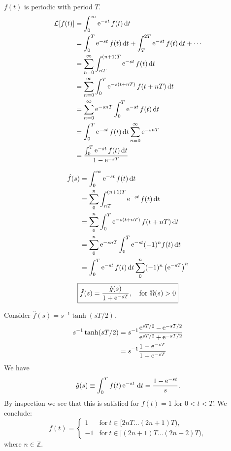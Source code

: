 {%
\begin{Solution}
  \label{solution L(f) f periodic}
  $f(t)$ is periodic with period $T$.
  \begin{align*}
    \mathcal{L}[f(t)]
    &= \int_0^\infty \mathop{\mathrm{e}}\nolimits^{-s t} f(t)\,\mathrm{d} t \\
    &= \int_0^T \mathop{\mathrm{e}}\nolimits^{-s t} f(t)\,\mathrm{d} t + \int_T^{2T} \mathop{\mathrm{e}}\nolimits^{-s t} f(t)\,\mathrm{d} t + \cdots \\
    &= \sum_{n=0}^\infty \int_{n T}^{(n+1)T} \mathop{\mathrm{e}}\nolimits^{-s t} f(t)\,\mathrm{d} t \\
    &= \sum_{n=0}^\infty \int_0^T \mathop{\mathrm{e}}\nolimits^{-s (t+n T)} f(t+n T)\,\mathrm{d} t \\
    &= \sum_{n=0}^\infty \mathop{\mathrm{e}}\nolimits^{-s n T} \int_0^T \mathop{\mathrm{e}}\nolimits^{-s t} f(t)\,\mathrm{d} t \\
    &= \int_0^T \mathop{\mathrm{e}}\nolimits^{-s t} f(t)\,\mathrm{d} t \sum_{n=0}^\infty \mathop{\mathrm{e}}\nolimits^{-s n T} \\
    &= \frac{\int_0^T \mathop{\mathrm{e}}\nolimits^{-s t} f(t)\,\mathrm{d} t}{1-\mathop{\mathrm{e}}\nolimits^{-s T}}
  \end{align*}
\end{Solution}







\begin{Solution}
  \label{solution L(f) f odd periodic}
  \begin{align*}
    \hat{f}(s)    
    &= \int_0^\infty \mathop{\mathrm{e}}\nolimits^{-s t} f(t) \,\mathrm{d} t \\
    &= \sum_0^n  \int_{n T}^{(n+1) T} \mathop{\mathrm{e}}\nolimits^{-s t} f(t) \,\mathrm{d} t \\
    &= \sum_0^n \int_0^T \mathop{\mathrm{e}}\nolimits^{-s (t + n T)} f(t + n T) \,\mathrm{d} t \\
    &= \sum_0^n \mathop{\mathrm{e}}\nolimits^{-s n T} \int_0^T \mathop{\mathrm{e}}\nolimits^{-s t} (-1)^n f(t) \,\mathrm{d} t \\
    &= \int_0^T \mathop{\mathrm{e}}\nolimits^{-s t} f(t) \,\mathrm{d} t \sum_0^n (-1)^n \left( \mathop{\mathrm{e}}\nolimits^{-s T} \right)^n 
  \end{align*}
  \[
  \boxed{
    \hat{f}(s) = \frac{ \hat{g}(s) }{ 1 + \mathop{\mathrm{e}}\nolimits^{-s T} }, \quad \mathrm{for}\ \Re(s) > 0
    }
  \]

  Consider $\hat{f}(s) = s^{-1} \tanh(s T/2)$.
  \begin{align*}
    s^{-1} \tanh(s T / 2)
    &= s^{-1} \frac{ \mathop{\mathrm{e}}\nolimits^{s T / 2} - \mathop{\mathrm{e}}\nolimits^{-s T / 2} }{ \mathop{\mathrm{e}}\nolimits^{s T / 2} + \mathop{\mathrm{e}}\nolimits^{-s T / 2} } \\
    &= s^{-1} \frac{ 1 - \mathop{\mathrm{e}}\nolimits^{-s T} }{ 1 + \mathop{\mathrm{e}}\nolimits^{-s T} } \\
  \end{align*}
  We have
  \[
  \hat{g}(s) \equiv \int_0^T f(t) \mathop{\mathrm{e}}\nolimits^{-s t} \,\mathrm{d} t = \frac{ 1 - \mathop{\mathrm{e}}\nolimits^{-s t} }{s}.
  \]
  By inspection we see that this is satisfied for $f(t) = 1$ for 
  $0 < t < T$.  We conclude:
  \[
  \boxed{
    f(t) = 
    \begin{cases}
      1 &\mathrm{for}\ t \in [2 n T \ldots (2n+1) T), \\
      -1 &\mathrm{for}\ t \in [(2 n+1) T \ldots (2n+2) T),
    \end{cases}
    }
  \]
  where $n \in \mathbb{Z}$.
\end{Solution}







}
